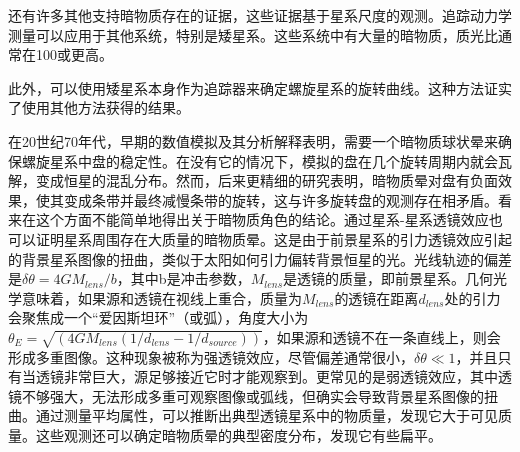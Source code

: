 

还有许多其他支持暗物质存在的证据，这些证据基于星系尺度的观测。追踪动力学测量可以应用于其他系统，特别是矮星系。这些系统中有大量的暗物质，质光比通常在100或更高。

此外，可以使用矮星系本身作为追踪器来确定螺旋星系的旋转曲线。这种方法证实了使用其他方法获得的结果。

在20世纪70年代，早期的数值模拟及其分析解释表明，需要一个暗物质球状晕来确保螺旋星系中盘的稳定性。在没有它的情况下，模拟的盘在几个旋转周期内就会瓦解，变成恒星的混乱分布。然而，后来更精细的研究表明，暗物质晕对盘有负面效果，使其变成条带并最终减慢条带的旋转，这与许多旋转盘的观测存在相矛盾。看来在这个方面不能简单地得出关于暗物质角色的结论。通过星系-星系透镜效应也可以证明星系周围存在大质量的暗物质晕。这是由于前景星系的引力透镜效应引起的背景星系图像的扭曲，类似于太阳如何引力偏转背景恒星的光。光线轨迹的偏差是$\delta \theta = 4GM_{lens}/b$，其中b是冲击参数，$M_{lens}$是透镜的质量，即前景星系。几何光学意味着，如果源和透镜在视线上重合，质量为$M_{lens}$的透镜在距离$d_{lens}$处的引力会聚焦成一个“爱因斯坦环”（或弧），角度大小为$\theta_E = \sqrt{(4GM_{lens}(1/d_{lens} - 1/d_{source}))}$，如果源和透镜不在一条直线上，则会形成多重图像。这种现象被称为强透镜效应，尽管偏差通常很小，$\delta\theta \ll 1$，并且只有当透镜非常巨大，源足够接近它时才能观察到。更常见的是弱透镜效应，其中透镜不够强大，无法形成多重可观察图像或弧线，但确实会导致背景星系图像的扭曲。通过测量平均属性，可以推断出典型透镜星系中的物质量，发现它大于可见质量。这些观测还可以确定暗物质晕的典型密度分布，发现它有些扁平。